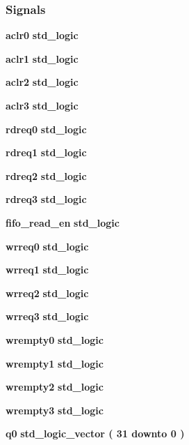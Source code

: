 \subsubsection*{Signals}
 \begin{DoxyCompactItemize}
\item 
{\bf aclr0} {\bfseries \textcolor{comment}{std\+\_\+logic}\textcolor{vhdlchar}{ }} 
\item 
{\bf aclr1} {\bfseries \textcolor{comment}{std\+\_\+logic}\textcolor{vhdlchar}{ }} 
\item 
{\bf aclr2} {\bfseries \textcolor{comment}{std\+\_\+logic}\textcolor{vhdlchar}{ }} 
\item 
{\bf aclr3} {\bfseries \textcolor{comment}{std\+\_\+logic}\textcolor{vhdlchar}{ }} 
\item 
{\bf rdreq0} {\bfseries \textcolor{comment}{std\+\_\+logic}\textcolor{vhdlchar}{ }} 
\item 
{\bf rdreq1} {\bfseries \textcolor{comment}{std\+\_\+logic}\textcolor{vhdlchar}{ }} 
\item 
{\bf rdreq2} {\bfseries \textcolor{comment}{std\+\_\+logic}\textcolor{vhdlchar}{ }} 
\item 
{\bf rdreq3} {\bfseries \textcolor{comment}{std\+\_\+logic}\textcolor{vhdlchar}{ }} 
\item 
{\bf fifo\+\_\+read\+\_\+en} {\bfseries \textcolor{comment}{std\+\_\+logic}\textcolor{vhdlchar}{ }} 
\item 
{\bf wrreq0} {\bfseries \textcolor{comment}{std\+\_\+logic}\textcolor{vhdlchar}{ }} 
\item 
{\bf wrreq1} {\bfseries \textcolor{comment}{std\+\_\+logic}\textcolor{vhdlchar}{ }} 
\item 
{\bf wrreq2} {\bfseries \textcolor{comment}{std\+\_\+logic}\textcolor{vhdlchar}{ }} 
\item 
{\bf wrreq3} {\bfseries \textcolor{comment}{std\+\_\+logic}\textcolor{vhdlchar}{ }} 
\item 
{\bf wrempty0} {\bfseries \textcolor{comment}{std\+\_\+logic}\textcolor{vhdlchar}{ }} 
\item 
{\bf wrempty1} {\bfseries \textcolor{comment}{std\+\_\+logic}\textcolor{vhdlchar}{ }} 
\item 
{\bf wrempty2} {\bfseries \textcolor{comment}{std\+\_\+logic}\textcolor{vhdlchar}{ }} 
\item 
{\bf wrempty3} {\bfseries \textcolor{comment}{std\+\_\+logic}\textcolor{vhdlchar}{ }} 
\item 
{\bf q0} {\bfseries \textcolor{comment}{std\+\_\+logic\+\_\+vector}\textcolor{vhdlchar}{ }\textcolor{vhdlchar}{(}\textcolor{vhdlchar}{ }\textcolor{vhdlchar}{ } \textcolor{vhdldigit}{31} \textcolor{vhdlchar}{ }\textcolor{keywordflow}{downto}\textcolor{vhdlchar}{ }\textcolor{vhdlchar}{ } \textcolor{vhdldigit}{0} \textcolor{vhdlchar}{ }\textcolor{vhdlchar}{)}\textcolor{vhdlchar}{ }} 

\end{DoxyCompactItemize}

